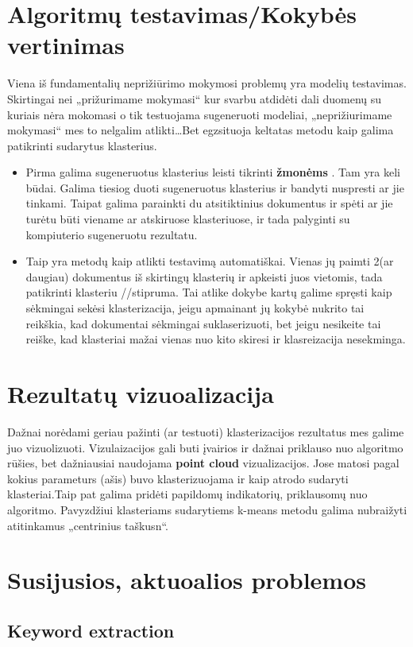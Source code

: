 \documentclass{VUMIFInfKursinis}
\begin{document}
\section{Algoritmų testavimas/Kokybės vertinimas}
Viena iš fundamentalių neprižiūrimo mokymosi problemų yra modelių testavimas. Skirtingai nei „prižurimame mokymasi“ kur svarbu atdidėti dali duomenų su kuriais nėra mokomasi o tik testuojama sugeneruoti modeliai, „neprižiurimame mokymasi“ mes to nelgalim atlikti\ldots Bet egzsituoja keltatas metodu kaip galima patikrinti sudarytus klasterius.
\begin{itemize}
	\item Pirma galima sugeneruotus klasterius leisti tikrinti \textbf{žmonėms }. Tam yra keli būdai. Galima tiesiog duoti sugeneruotus klasterius ir bandyti nuspresti ar jie tinkami. Taipat galima parainkti du atsitiktinius dokumentus ir spėti ar jie turėtu būti viename ar atskiruose klasteriuose, ir tada palyginti su kompiuterio sugeneruotu rezultatu. 
	\item Taip yra metodų kaip atlikti testavimą automatiškai. Vienas jų paimti 2(ar daugiau) dokumentus iš skirtingų klasterių ir apkeisti juos vietomis, tada patikrinti klasteriu //stipruma. Tai atlike dokybe kartų galime spręsti kaip sėkmingai sekėsi klasterizacija, jeigu apmainant jų kokybė nukrito tai reikškia, kad dokumentai sėkmingai suklaserizuoti, bet jeigu nesikeite tai reiške, kad klasteriai mažai vienas nuo kito skiresi ir klasreizacija nesekminga.
\end{itemize}

\section{Rezultatų vizuoalizacija}
Dažnai norėdami geriau pažinti (ar testuoti) klasterizacijos rezultatus mes galime juo vizuolizuoti. Vizulaizacijos gali buti įvairios ir dažnai priklauso nuo algoritmo rūšies, bet dažniausiai naudojama \textbf{point cloud} vizualizacijos. Jose matosi pagal kokius parameturs (ašis) buvo klasterizuojama ir kaip atrodo sudaryti klasteriai.Taip pat galima pridėti papildomų indikatorių, priklausomų nuo algoritmo. Pavyzdžiui klasteriams sudarytiems k-means metodu galima nubraižyti atitinkamus „centrinius taškusn“.

\section{Susijusios, aktuoalios problemos}
\subsection{Keyword extraction}
\end{document}
